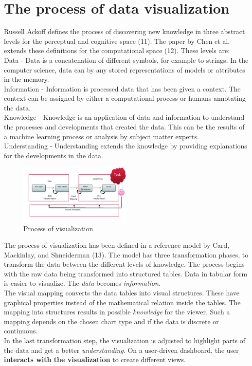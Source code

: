 \documentclass[american,a4paper,oneside,,tablecaptionabove]{scrbook}
\begin{document}
\section{The process of data
visualization}\label{the-process-of-data-visualization}

Russell Ackoff defines the process of discovering new knowledge in three
abstract levels for the perceptual and cognitive space (11). The paper
by Chen et al. extends these definitions for the computational space
(12). These levels are:\\
Data - Data is a concatenation of different symbols, for example to
strings. In the computer science, data can by any stored representations
of models or attributes in the memory.\\
Information - Information is processed data that has been given a
context. The context can be assigned by either a computational process
or humans annotating the data.\\
Knowledge - Knowledge is an application of data and information to
understand the processes and developments that created the data. This
can be the results of a machine learning process or analysis by subject
matter experts.\\
Understanding - Understanding extends the knowledge by providing
explanations for the developments in the data.

\begin{figure}
\centering
\includegraphics[width=0.50000\textwidth]{images/krypczyk_diagrammarten_1.jpg}
\caption{Process of visualization}
\end{figure}

The process of visualization has been defined in a reference model by
Card, Mackinlay, and Shneiderman (13). The model has three
transformation phases, to transform the data between the different
levels of knowledge. The process begins with the raw data being
transformed into structured tables. Data in tabular form is easier to
visualize. The \emph{data} becomes \emph{information}.\\
The visual mapping converts the data tables into visual structures.
These have graphical properties instead of the mathematical relation
inside the tables. The mapping into structures results in possible
\emph{knowledge} for the viewer. Such a mapping depends on the chosen
chart type and if the data is discrete or continuous.\\
In the last transformation step, the visualization is adjusted to
highlight parts of the data and get a better \emph{understanding}. On a
user-driven dashboard, the user \textbf{interacts with the
visualization} to create different views.
\end{document}

